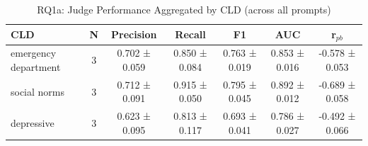 \begin{table}[htbp]
\centreing
\caption{RQ1a: Judge Performance Aggregated by CLD (across all prompts)}
\label{tab:rq1a_by_cld}
\begin{tabular}{lcccccc}
\toprule
\textbf{CLD} & \textbf{N} & \textbf{Precision} & \textbf{Recall} & \textbf{F1} & \textbf{AUC} & \textbf{r$_{pb}$} \\
\midrule
emergency department & 3 & 0.702 ± 0.059 & 0.850 ± 0.084 & 0.763 ± 0.019 & 0.853 ± 0.016 & -0.578 ± 0.053 \\
social norms & 3 & 0.712 ± 0.091 & 0.915 ± 0.050 & 0.795 ± 0.045 & 0.892 ± 0.012 & -0.689 ± 0.058 \\
depressive & 3 & 0.623 ± 0.095 & 0.813 ± 0.117 & 0.693 ± 0.041 & 0.786 ± 0.027 & -0.492 ± 0.066 \\
\bottomrule
\end{tabular}
\end{table}